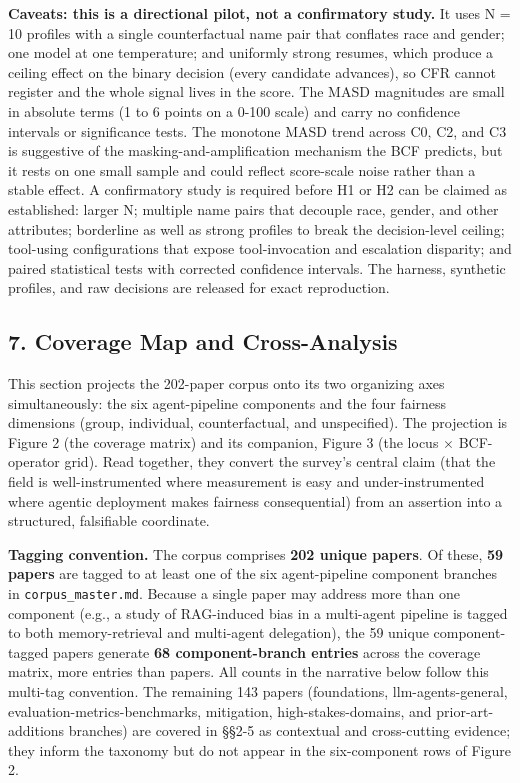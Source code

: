 \documentclass[10pt]{article}
\begin{document}
\textbf{Caveats: this is a directional pilot, not a confirmatory study.} It uses N = 10 profiles with a single counterfactual name pair that conflates race and gender; one model at one temperature; and uniformly strong resumes, which produce a ceiling effect on the binary decision (every candidate advances), so CFR cannot register and the whole signal lives in the score. The MASD magnitudes are small in absolute terms (1 to 6 points on a 0-100 scale) and carry no confidence intervals or significance tests. The monotone MASD trend across C0, C2, and C3 is suggestive of the masking-and-amplification mechanism the BCF predicts, but it rests on one small sample and could reflect score-scale noise rather than a stable effect. A confirmatory study is required before H1 or H2 can be claimed as established: larger N; multiple name pairs that decouple race, gender, and other attributes; borderline as well as strong profiles to break the decision-level ceiling; tool-using configurations that expose tool-invocation and escalation disparity; and paired statistical tests with corrected confidence intervals. The harness, synthetic profiles, and raw decisions are released for exact reproduction.


\subsection*{7. Coverage Map and Cross-Analysis}

This section projects the 202-paper corpus onto its two organizing axes simultaneously: the six agent-pipeline components and the four fairness dimensions (group, individual, counterfactual, and unspecified). The projection is Figure 2 (the coverage matrix) and its companion, Figure 3 (the locus $\times$ BCF-operator grid). Read together, they convert the survey's central claim (that the field is well-instrumented where measurement is easy and under-instrumented where agentic deployment makes fairness consequential) from an assertion into a structured, falsifiable coordinate.

\textbf{Tagging convention.} The corpus comprises \textbf{202 unique papers}. Of these, \textbf{59 papers} are tagged to at least one of the six agent-pipeline component branches in \texttt{corpus\_master.md}. Because a single paper may address more than one component (e.g., a study of RAG-induced bias in a multi-agent pipeline is tagged to both memory-retrieval and multi-agent delegation), the 59 unique component-tagged papers generate \textbf{68 component-branch entries} across the coverage matrix, more entries than papers. All counts in the narrative below follow this multi-tag convention. The remaining 143 papers (foundations, llm-agents-general, evaluation-metrics-benchmarks, mitigation, high-stakes-domains, and prior-art-additions branches) are covered in \S{}\S{}2-5 as contextual and cross-cutting evidence; they inform the taxonomy but do not appear in the six-component rows of Figure 2.
\end{document}
